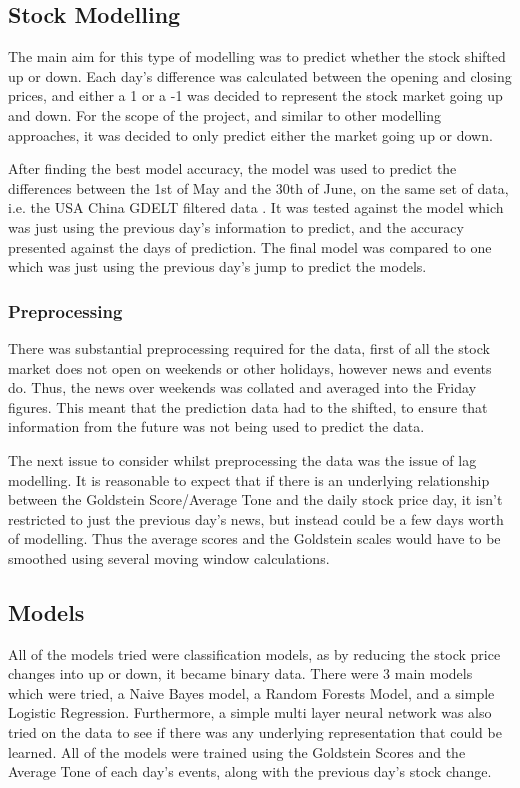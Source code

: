 \subsection{Stock Modelling}

The main aim for this type of modelling was to predict whether the stock shifted up or down. Each day's difference was calculated between the opening and closing prices, and either a 1 or a -1 was decided to represent the stock market going up and down. For the scope of the project, and similar to other modelling approaches, it was decided to only predict either the market going up or down.

After finding the best model accuracy, the model was used to predict the differences between the 1st of May and the 30th of June, on the same set of data, i.e. the USA China GDELT filtered data . It was tested against the model which was just using the previous day's information to predict, and the accuracy presented against the days of prediction. The final model was compared to one which was just using the previous day's jump to predict the models. 

\subsubsection{Preprocessing}
There was substantial preprocessing required for the data, first of all the stock market does not open on weekends or other holidays, however news and events do. Thus, the news over weekends was collated and averaged into the Friday figures. This meant that the prediction data had to the shifted, to ensure that information from the future was not being used to predict the data.

The next issue to consider whilst preprocessing the data was the issue of lag modelling. It is reasonable to expect that if there is an underlying relationship between the Goldstein Score/Average Tone and the daily stock price day, it isn't restricted to just the previous day's news, but instead could be a few days worth of modelling. Thus the average scores and the Goldstein scales would have to be smoothed using several moving window calculations.

\subsection{Models}
All of the models tried were classification models, as by reducing the stock price changes into up or down, it became binary data. There were 3 main models which were tried, a Naive Bayes model, a Random Forests Model, and a simple Logistic Regression. Furthermore, a simple multi layer neural network was also tried on the data to see if there was any underlying representation that could be learned. All of the models were trained using the Goldstein Scores and the Average Tone of each day's events, along with the previous day's stock change. 

